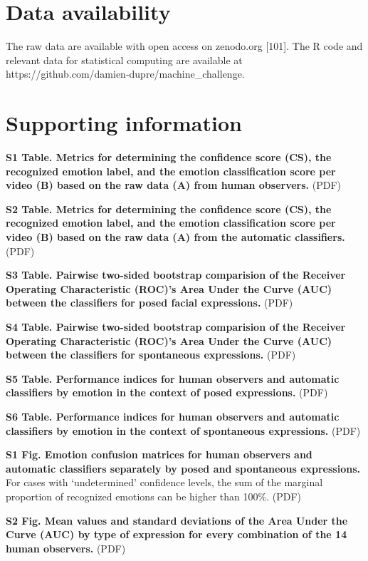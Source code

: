 \documentclass[10pt,letterpaper]{article}
\begin{document}
\hypertarget{data-availability}{%
\section{Data availability}\label{data-availability}}

The raw data are available with open access on zenodo.org {[}101{]}. The R code and relevant data for statistical computing are available at https://github.com/damien-dupre/machine\_challenge.

\hypertarget{supporting-information}{%
\section{Supporting information}\label{supporting-information}}

\textbf{S1 Table. Metrics for determining the confidence score (CS), the recognized emotion label, and the emotion classification score per video (B) based on the raw data (A) from human observers.}
(PDF)

\textbf{S2 Table. Metrics for determining the confidence score (CS), the recognized emotion label, and the emotion classification score per video (B) based on the raw data (A) from the automatic classifiers.}
(PDF)

\textbf{S3 Table. Pairwise two-sided bootstrap comparision of the Receiver Operating Characteristic (ROC)'s Area Under the Curve (AUC) between the classifiers for posed facial expressions.}
(PDF)

\textbf{S4 Table. Pairwise two-sided bootstrap comparision of the Receiver Operating Characteristic (ROC)'s Area Under the Curve (AUC) between the classifiers for spontaneous expressions.}
(PDF)

\textbf{S5 Table. Performance indices for human observers and automatic classifiers by emotion in the context of posed expressions.}
(PDF)

\textbf{S6 Table. Performance indices for human observers and automatic classifiers by emotion in the context of spontaneous expressions.}
(PDF)

\textbf{S1 Fig. Emotion confusion matrices for human observers and automatic classifiers separately by posed and spontaneous expressions.} For cases with `undetermined' confidence levels, the sum of the marginal proportion of recognized emotions can be higher than 100\%.
(PDF)

\textbf{S2 Fig. Mean values and standard deviations of the Area Under the Curve (AUC) by type of expression for every combination of the 14 human observers.}
(PDF)
\end{document}

